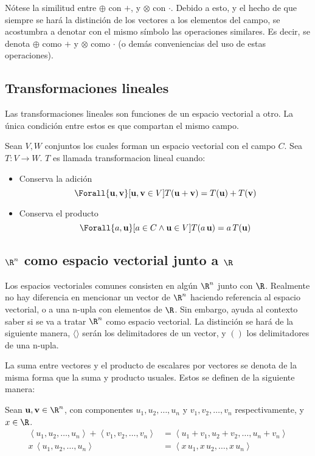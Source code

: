 Nótese la similitud entre $\oplus$ con $+$, y $\otimes$ con $\cdot$. Debido a esto,
y el hecho de que siempre se hará la distinción de los vectores a los elementos
del campo, se acostumbra a denotar con el mismo símbolo las operaciones similares. Es decir,
se denota $\oplus$ como $+$ y $\otimes$ como $\cdot$ (o demás conveniencias del uso de estas
operaciones).

\subsection{Transformaciones lineales}

Las transformaciones lineales son funciones de un espacio vectorial a otro.
La única condición entre estos es que compartan el mismo campo.

Sean $V,W$ conjuntos los cuales forman un espacio vectorial con el campo $C$. Sea
$T: V \to W$. $T$ es llamada transformacion lineal cuando:

\begin{itemize}
  \item Conserva la adición
  \[
    \Forall{\mathbf{u},\mathbf{v}}[
      \mathbf{u},\mathbf{v} \in V
    ]{
      T(\mathbf{u} + \mathbf{v}) = T(\mathbf{u}) + T(\mathbf{v})
    }
  \]
  \item Conserva el producto
  \[
    \Forall{a,\mathbf{u}}[a \in C \land \mathbf{u} \in V]{
      T(a\,\mathbf{u}) = a\,T(\mathbf{u})
    }
  \]
\end{itemize}

\subsection{\texorpdfstring{$\R^n$}{Rn} como espacio vectorial junto a \texorpdfstring{$\R$}{R}}

Los espacios vectoriales comunes consisten en algún $\R^n$ junto con $\R$. Realmente
no hay diferencia en mencionar un vector de $\R^n$ haciendo referencia al espacio vectorial,
o a una n-upla con elementos de $\R$. Sin embargo, ayuda al contexto saber si se va a
tratar $\R^n$ como espacio vectorial. La distinción se hará de la siguiente manera,
$\langle \rangle$ serán los delimitadores de un vector, y $()$ los delimitadores de una n-upla.

La suma entre vectores y el producto de escalares por vectores se denota de la misma
forma que la suma y producto usuales. Estos se definen de la siguiente manera:

Sean $\mathbf{u},\mathbf{v}\in\R^n$, con componentes
$u_1,u_2,\dots,u_n$ y $v_1,v_2,\dots,v_n$ respectivamente, y $x\in\R$.
\begin{align*}
  \left<u_1,u_2,\dots,u_n\right> + \left<v_1,v_2,\dots,v_n\right>
  &=
  \left<u_1 + v_1, u_2  + v_2,\dots,u_n + v_n\right>\\
  x\,\left<u_1,u_2,\dots,u_n\right> &= \left<x\,u_1,x\,u_2,\dots,x\,u_n\right>
\end{align*}

